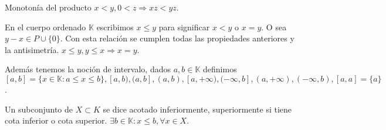 \begin{prop}
    Monotonía del producto $x<y, 0<z \Rightarrow xz <yz$.
\end{prop}

En el cuerpo ordenado $\mathbb{K}$ escribimos $x \leq y$ para significar $x<y$ o $x=y$. O sea $y-x \in P \cup \{0\}$. Con esta relación se cumplen todas las propiedades anteriores y la antisimetría. $x \leq y, y \leq x \Rightarrow x = y$.

Además tenemos la noción de intervalo, dados $a,b \in \mathbb{K}$ definimos $[a,b ] = \{ x \in \mathbb{K} : a \leq x \leq b \}, [a, b), (a, b], (a,b), [a, +\infty), (-\infty, b], (a, +\infty), (-\infty, b), [a, a] = \{a\}$.

Un subconjunto de $X \subset K$ se dice acotado inferiormente, superiormente si tiene cota inferior o cota superior. $\exists b \in \mathbb{K}: x \leq b, \forall x \in X$.
